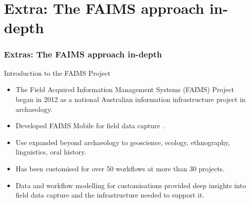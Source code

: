 
\section{Extra: The FAIMS approach in-depth}

\begin{sectionframe} %
	\frametitle{Extras: The FAIMS approach in-depth}


\end{sectionframe}


\begin{frame}{Introduction to the FAIMS Project}
    \begin{itemize}
        \item The Field Acquired Information Management Systems (FAIMS) Project began in 2012 as a national Australian information infrastructure project in archaeology.
        \item Developed FAIMS Mobile for field data capture \parencite{Ballsun-Stanton2018-zd}.
        \item Use expanded beyond archaeology to geoscience, ecology, ethnography, linguistics, oral history.
        \item Has been customised for over 50 workflows at more than 30 projects. 
        \item Data and workflow modelling for customisations provided deep insights into field data capture and the infrastructure needed to support it.
    \end{itemize}
\end{frame}
